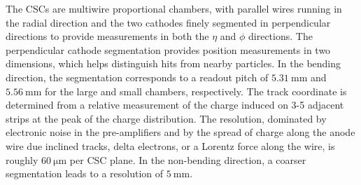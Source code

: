 The CSCs are multiwire proportional chambers, with parallel wires running in the radial direction and the two cathodes finely segmented in perpendicular directions to provide measurements in both the $\eta$ and $\phi$ directions. The perpendicular cathode segmentation provides position measurements in two dimensions, which helps distinguish hits from nearby particles. In the bending direction, the segmentation corresponds to a readout pitch of $\SI{5.31}{\milli\meter}$ and $\SI{5.56}{\milli\meter}$ for the large and small chambers, respectively.  The track coordinate is determined from a relative measurement of the charge induced on 3-5 adjacent strips at the peak of the charge distribution. The resolution, dominated by electronic noise in the pre-amplifiers and by the spread of charge along the anode wire due inclined tracks, delta electrons, or a Lorentz force along the wire, is roughly $\SI{60}{\micro\meter}$ per CSC plane. In the non-bending direction, a coarser segmentation leads to a resolution of $\SI{5}{\milli\meter}$. 

